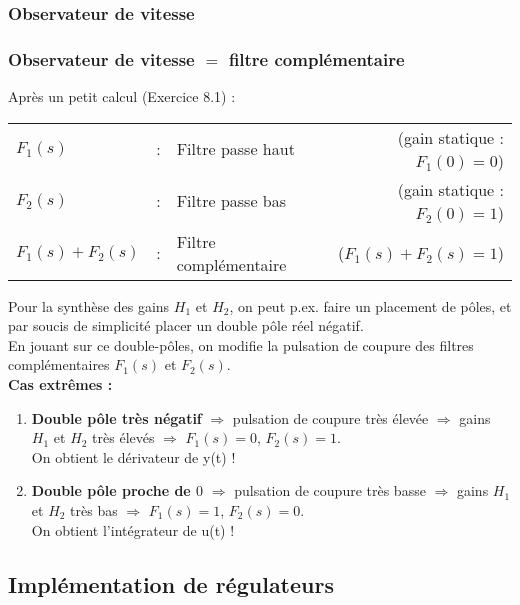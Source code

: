 \documentclass[document.tex]{subfiles}
\begin{document}


\subsubsection{Observateur de vitesse}


\subsubsection{Observateur de vitesse $=$ filtre complémentaire}

Après un petit calcul (Exercice 8.1) :\\


\begin{tabular}{|l c l r|}
\hline
$F_1(s)$ & : & Filtre passe haut & (gain statique : $F_1(0)=0$)\\
$F_2(s)$ & : & Filtre passe bas & (gain statique : $F_2(0)=1$) \\
$F_1(s) + F_2(s)$ & : & Filtre complémentaire & ($F_1(s)+F_2(s) = 1$)\\\hline
\end{tabular}

Pour la synthèse des gains $H_1$ et $H_2$, on peut p.ex. faire un placement de pôles, et par soucis de simplicité placer un double pôle réel négatif.\\

En jouant sur ce double-pôles, on modifie la pulsation de coupure des filtres complémentaires $F_1(s)$ et $F_2(s)$.\\

\textbf{Cas extrêmes :}
\begin{enumerate}
\item \textbf{Double pôle très négatif} $\Rightarrow$ pulsation de coupure très élevée $\Rightarrow$  gains $H_1$ et $H_2$ très élevés $\Rightarrow$  $F_1(s) = 0$, $F_2(s) = 1$. \\
On obtient le dérivateur de y(t) !
\item \textbf{Double pôle proche de $0$} $\Rightarrow$ pulsation de coupure très basse $\Rightarrow$ gains $H_1$ et $H_2$ très bas $\Rightarrow$ $F_1(s) = 1$, $F_2(s) = 0$. \\
On obtient l'intégrateur de u(t) !
\end{enumerate}

\subsection{Implémentation de régulateurs}
\end{document}
